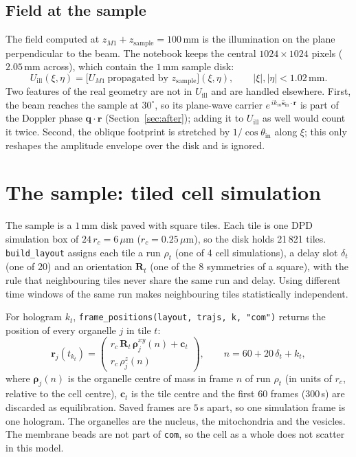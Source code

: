 \documentclass[11pt,a4paper]{article}
\newcommand{\vr}{\mathbf{r}}
\newcommand{\vq}{\mathbf{q}}
\newcommand{\shat}{\hat{\mathbf{s}}}
\newcommand{\um}{\,\mu\mathrm{m}}
\newcommand{\mm}{\,\mathrm{mm}}
\newcommand{\ee}{e}
\newcommand{\code}[1]{\texttt{\small #1}}
\begin{document}
\subsection{Field at the sample}

The field computed at $z_{M1}+z_\mathrm{sample} = 100\mm$ is the illumination
on the plane perpendicular to the beam. The notebook keeps the central
$1024\times1024$ pixels ($2.05\mm$ across), which contain the $1\mm$ sample
disk:
\begin{equation}
  U_\mathrm{ill}(\xi,\eta) = \big[U_{M1}\ \text{propagated by } z_\mathrm{sample}\big](\xi,\eta),
  \qquad |\xi|,|\eta| < 1.02\mm .
\end{equation}
Two features of the real geometry are not in $U_\mathrm{ill}$ and are handled
elsewhere. First, the beam reaches the sample at $30^\circ$, so its plane-wave
carrier $\ee^{\,ik_m\shat_\mathrm{in}\cdot\vr}$ is part of the Doppler phase
$\vq\cdot\vr$ (Section~\ref{sec:after}); adding it to $U_\mathrm{ill}$ as well
would count it twice. Second, the oblique footprint is stretched by
$1/\cos\theta_\mathrm{in}$ along $\xi$; this only reshapes the amplitude
envelope over the disk and is ignored.

\section{The sample: tiled cell simulation}
\label{sec:sample}

The sample is a $1\mm$ disk paved with square tiles. Each tile is one DPD
simulation box of $24\,r_c = 6\um$ ($r_c = 0.25\um$), so the disk holds
21\,821 tiles. \code{build\_layout} assigns each tile a run $\rho_t$ (one of
4 cell simulations), a delay slot $\delta_t$ (one of 20) and an orientation
$\mathbf{R}_t$ (one of the 8 symmetries of a square), with the rule that
neighbouring tiles never share the same run and delay. Using different time
windows of the same run makes neighbouring tiles statistically independent.

For hologram $k_t$, \code{frame\_positions(layout, trajs, k, "com")} returns
the position of every organelle $j$ in tile $t$:
\begin{equation}
  \vr_j(t_{k_t}) =
  \begin{pmatrix} r_c\,\mathbf{R}_t\,\boldsymbol{\rho}^{xy}_{j}(n) + \mathbf{c}_t \\ r_c\,\rho^{z}_{j}(n)\end{pmatrix},
  \qquad n = 60 + 20\,\delta_t + k_t,
  \label{eq:frame}
\end{equation}
where $\boldsymbol{\rho}_j(n)$ is the organelle centre of mass in frame $n$ of
run $\rho_t$ (in units of $r_c$, relative to the cell centre), $\mathbf{c}_t$
is the tile centre and the first 60 frames ($300\,$s) are discarded as
equilibration. Saved frames are $5\,$s apart, so one simulation frame is one
hologram. The organelles are the nucleus, the mitochondria and the vesicles.
The membrane beads are not part of \code{com}, so the cell as a whole does not
scatter in this model.
\end{document}
